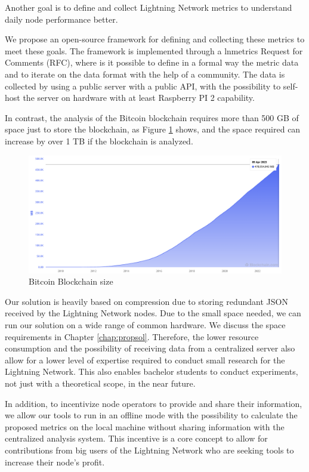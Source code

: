 Another goal is to define and collect Lightning Network
metrics to understand daily node performance better. 

We propose an open-source framework
for defining and collecting these metrics to meet these goals. The framework
is implemented through a lnmetrics Request for Comments (RFC), where is it possible to define
in a formal way the metric data and to iterate on the data format with the help of a community.
The data is collected by using a public server with a public API, with the possibility to
self-host the server on hardware with at least Raspberry PI 2 capability.

In contrast, the analysis of the Bitcoin blockchain requires more than
500 GB of space just to store the blockchain, as Figure \ref{fig:blockchain_size} shows,
and the space required can increase by over 1 TB if the blockchain is analyzed.

\begin{figure}[h]
  \begin{center}
    \includegraphics[width=0.6\columnwidth]{imgs/bitcoin-blockchain-size.png}
  \end{center}
  \caption{Bitcoin Blockchain size}
  \label{fig:blockchain_size}
\end{figure}

Our solution is heavily based on compression due to storing redundant JSON received
by the Lightning Network nodes. Due to the small space needed, we can run our solution on a
wide range of common hardware. We discuss the space requirements in Chapter \ref{chap:propsol}.
Therefore, the lower resource consumption and the possibility of receiving data from a
centralized server also allow for a lower level of expertise required to conduct small
research for the Lightning Network. This also enables bachelor students to conduct
experiments, not just with a theoretical scope, in the near future.

In addition, to incentivize node operators to provide and share their information, we allow our
tools to run in an offline mode with the possibility to calculate the proposed metrics on the
local machine without sharing information with the centralized analysis system. This incentive
is a core concept to allow for contributions from big users of the Lightning Network who are
seeking tools to increase their node's profit.

